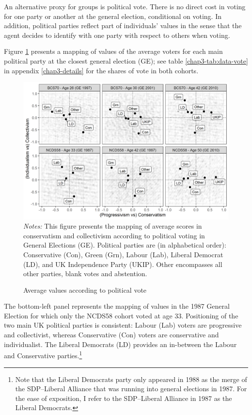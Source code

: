 An alternative proxy for groups is political vote. There is no direct cost in voting for one party or another at the general election, conditional on voting. In addition, political parties reflect part of individuals' values in the sense that the agent decides to identify with one party with respect to others when voting.

Figure \ref{chap3-fig:vote-v5} presents a mapping of values of the average voters for each main political party at the closest general election (GE); see table \ref{chap3-tab:data-vote} in appendix \ref{chap3-details} for the shares of vote in both cohorts.
\begin{figure}[!tb]
    \centering
    \caption{Average values according to political vote}
    \label{chap3-fig:vote-v5}
    \includegraphics[width=\linewidth]{chap3/graphic/vote-v5.png}
    \hrulefill
	\vspace{-3em}
	\justify\singlespacing\footnotesize{\textit{Notes:} This figure presents the mapping of average scores in conservatism and collectivism according to political voting in General Elections (GE). Political parties are (in alphabetical order): Conservative (Con), Green (Grn), Labour (Lab), Liberal Democrat (LD), and UK Independence Party (UKIP). Other encompasses all other parties, blank votes and abstention.}
\end{figure}
The bottom-left panel represents the mapping of values in the 1987 General Election for which only the NCDS58 cohort voted at age 33. Positioning of the two main UK political parties is consistent: Labour (Lab) voters are progressive and collectivist, whereas Conservative (Con) voters are conservative and individualist. The Liberal Democrats (LD) provides an in-between the Labour and Conservative parties.\footnote{Note that the Liberal Democrats party only appeared in 1988 as the merge of the SDP–Liberal Alliance that was running into general elections in 1987. For the ease of exposition, I refer to the SDP–Liberal Alliance in 1987 as the Liberal Democrats.}
